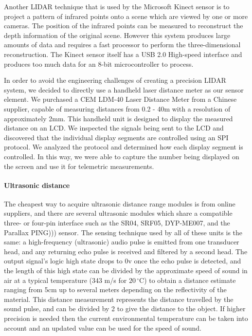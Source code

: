 \documentclass[12pt]{article}
\newcommand{\brand}{}
\newcommand{\degrees}{\,^{\circ}\mathrm{C}}
\begin{document}
    Another LIDAR technique that is used by the \brand{Microsoft Kinect} sensor is to project a pattern of infrared points onto a scene which are viewed by one or more cameras. The position of the infrared points can be measured to reconstruct the depth information of the original scene. However this system produces large amounts of data and requires a fast processor to perform the three-dimensional reconstruction. The Kinect sensor itself has a USB 2.0 High-speed interface and produces too much data for an 8-bit microcontroller to process.

    In order to avoid the engineering challenges of creating a precision LIDAR system, we decided to directly use a handheld laser distance meter as our sensor element. We purchased a \brand{CEM LDM-40} Laser Distance Meter from a Chinese supplier, capable of measuring distances from 0.2 - 40m with a resolution of approximately 2mm. This handheld unit is designed to display the measured distance on an LCD. We inspected the signals being sent to the LCD and discovered that the individual display segments are controlled using an SPI protocol. We analyzed the protocol and determined how each display segment is controlled. In this way, we were able to capture the number being displayed on the screen and use it for telemetric measurements.

    \paragraph*{Ultrasonic distance}
    The cheapest way to acquire ultrasonic distance range modules is from online suppliers, and there are several ultrasonic modules which share a compatible three- or four-pin interface such as the \brand{SR04}, \brand{SRF05}, \brand{DYP-ME007}, and the \brand{Parallax PING)))} sensor. The sensing technique used by all of these units is the same: a high-frequency (ultrasonic) audio pulse is emitted from one transducer head, and any returning echo pulse is received and filtered by a second head. The output signal's logic high state drops to 0v once the echo pulse is detected, and the length of this high state can be divided by the approximate speed of sound in air at a typical temperature (343 m/s for $20\degrees{}$) to obtain a distance estimate ranging from 5cm up to several meters depending on the reflectivity of the material. This distance measurement represents the distance travelled by the sound pulse, and can be divided by 2 to give the distance to the object. If higher precision is needed then the current environmental temperature can be taken into account and an updated value can be used for the speed of sound.
\end{document}
